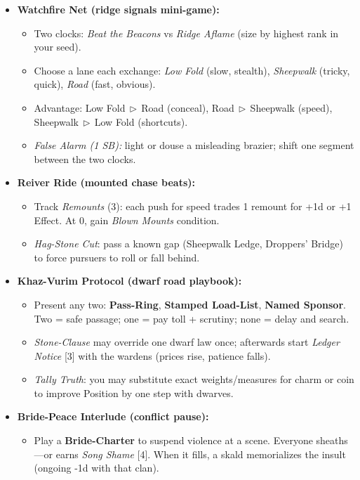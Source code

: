 \begin{itemize}
  \item \textbf{Watchfire Net (ridge signals mini-game):}
  \begin{itemize}
    \item Two clocks: \emph{Beat the Beacons} vs \emph{Ridge Aflame} (size by highest rank in your seed).
    \item Choose a lane each exchange: \emph{Low Fold} (slow, stealth), \emph{Sheepwalk} (tricky, quick), \emph{Road} (fast, obvious).
    \item Advantage: Low Fold\(\,\triangleright\,\)Road (conceal), Road\(\,\triangleright\,\)Sheepwalk (speed), Sheepwalk\(\,\triangleright\,\)Low Fold (shortcuts).
    \item \emph{False Alarm (1 SB):} light or douse a misleading brazier; shift one segment between the two clocks.
  \end{itemize}

  \item \textbf{Reiver Ride (mounted chase beats):}
  \begin{itemize}
    \item Track \emph{Remounts} (3): each push for speed trades 1 remount for +1d or +1 Effect. At 0, gain \emph{Blown Mounts} condition.
    \item \emph{Hag-Stone Cut}: pass a known gap (Sheepwalk Ledge, Droppers’ Bridge) to force pursuers to roll or fall behind.
  \end{itemize}

  \item \textbf{Khaz-Vurim Protocol (dwarf road playbook):}
  \begin{itemize}
    \item Present any two: \textbf{Pass-Ring}, \textbf{Stamped Load-List}, \textbf{Named Sponsor}. Two = safe passage; one = pay toll + scrutiny; none = delay and search.
    \item \emph{Stone-Clause} may override one dwarf law once; afterwards start \emph{Ledger Notice} [3] with the wardens (prices rise, patience falls).
    \item \emph{Tally Truth}: you may substitute exact weights/measures for charm or coin to improve Position by one step with dwarves.
  \end{itemize}

  \item \textbf{Bride-Peace Interlude (conflict pause):}
  \begin{itemize}
    \item Play a \textbf{Bride-Charter} to suspend violence at a scene. Everyone sheaths—or earns \emph{Song Shame} [4]. When it fills, a skald memorializes the insult (ongoing -1d with that clan).
  \end{itemize}


\end{itemize}

